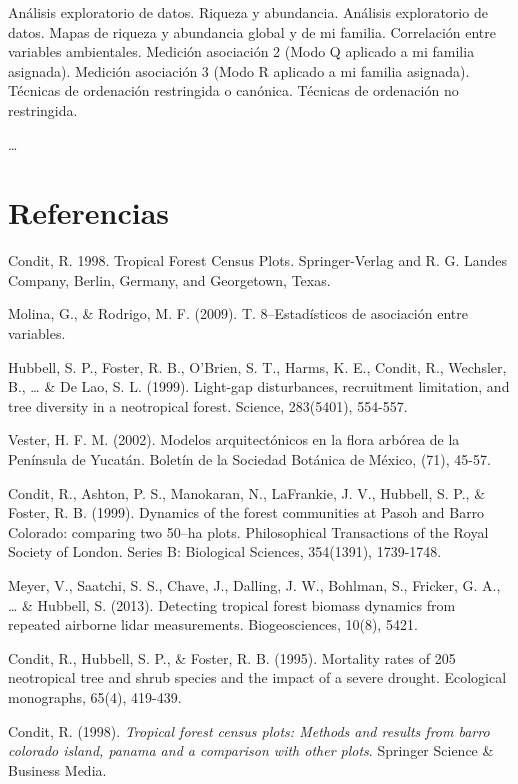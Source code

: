 \documentclass[11pt,]{article}
\begin{document}
Análisis exploratorio de datos. Riqueza y abundancia. Análisis
exploratorio de datos. Mapas de riqueza y abundancia global y de mi
familia. Correlación entre variables ambientales. Medición asociación 2
(Modo Q aplicado a mi familia asignada). Medición asociación 3 (Modo R
aplicado a mi familia asignada). Técnicas de ordenación restringida o
canónica. Técnicas de ordenación no restringida.

\ldots

\section{Referencias}\label{referencias}

Condit, R. 1998. Tropical Forest Census Plots. Springer-Verlag and R. G.
Landes Company, Berlin, Germany, and Georgetown, Texas.

Molina, G., \& Rodrigo, M. F. (2009). T. 8--Estadísticos de asociación
entre variables.

Hubbell, S. P., Foster, R. B., O'Brien, S. T., Harms, K. E., Condit, R.,
Wechsler, B., \ldots{} \& De Lao, S. L. (1999). Light-gap disturbances,
recruitment limitation, and tree diversity in a neotropical forest.
Science, 283(5401), 554-557.

Vester, H. F. M. (2002). Modelos arquitectónicos en la flora arbórea de
la Península de Yucatán. Boletín de la Sociedad Botánica de México,
(71), 45-57.

Condit, R., Ashton, P. S., Manokaran, N., LaFrankie, J. V., Hubbell, S.
P., \& Foster, R. B. (1999). Dynamics of the forest communities at Pasoh
and Barro Colorado: comparing two 50--ha plots. Philosophical
Transactions of the Royal Society of London. Series B: Biological
Sciences, 354(1391), 1739-1748.

Meyer, V., Saatchi, S. S., Chave, J., Dalling, J. W., Bohlman, S.,
Fricker, G. A., \ldots{} \& Hubbell, S. (2013). Detecting tropical
forest biomass dynamics from repeated airborne lidar measurements.
Biogeosciences, 10(8), 5421.

Condit, R., Hubbell, S. P., \& Foster, R. B. (1995). Mortality rates of
205 neotropical tree and shrub species and the impact of a severe
drought. Ecological monographs, 65(4), 419-439.

\hypertarget{refs}{}
\hypertarget{ref-condit1998tropical}{}
Condit, R. (1998). \emph{Tropical forest census plots: Methods and
results from barro colorado island, panama and a comparison with other
plots}. Springer Science \& Business Media.
\end{document}
